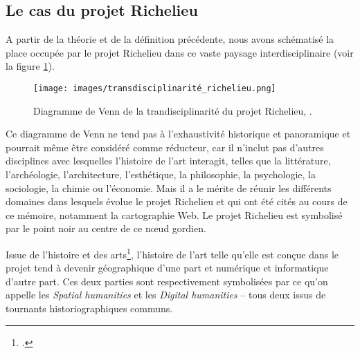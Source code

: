\subsection{Le cas du projet Richelieu}
A partir de la théorie et de la définition précédente, nous avons schématisé la place occupée par le projet Richelieu dans ce vaste paysage interdisciplinaire (voir la figure \ref{fig:transdis}).

\begin{figure}[ht!]
    \centering
    \texttt{[image: images/transdisciplinarité\_richelieu.png]}
    \caption{Diagramme de Venn de la trandisciplinarité du projet Richelieu, \mhd.}
    \label{fig:transdis}
\end{figure}

Ce diagramme de Venn ne tend pas à l'exhaustivité historique et panoramique et pourrait même être considéré comme réducteur, car il n'inclut pas d'autres disciplines avec lesquelles l'histoire de l'art interagit, telles que la littérature, l'archéologie, l'architecture, l'esthétique, la philosophie, la psychologie, la sociologie, la chimie ou l'économie. Mais il a le mérite de réunir les différents domaines dans lesquels évolue le projet Richelieu et qui ont été cités au cours de ce mémoire, notamment la cartographie Web. Le projet Richelieu est symbolisé par le point noir au centre de ce nœud gordien. 

Issue de l'histoire et des arts\footcite{ALTETLetude2023}, l'histoire de l'art telle qu'elle est conçue dans le projet tend à devenir géographique d'une part et numérique et informatique d'autre part. Ces deux parties sont respectivement symbolisées par ce qu'on appelle les \textit{Spatial humanities} et les \textit{Digital humanities} -- tous deux issus de tournants historiographiques communs. 

